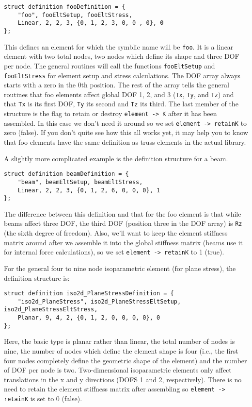 \begin{screen}
 \begin{verbatim}
struct definition fooDefinition = {   
    "foo", fooEltSetup, fooEltStress, 
    Linear, 2, 2, 3, {0, 1, 2, 3, 0, 0 , 0}, 0
};
 \end{verbatim}
\end{screen}

This defines an element for which the symblic name will be {\tt foo}.  It is
a linear element with two total nodes, two nodes which define its shape
and three DOF per node.  The general \felt{} routines will call the functions
{\tt fooEltSetup} and {\tt fooEltStress} for element setup and stress 
calculations.  The DOF array always starts with a zero in the
0th position.  The rest of the array tells the general \felt{} routines that
foo elements affect global DOF 1, 2, and 3 ({\tt Tx}, {\tt Ty}, and 
{\tt Tz}) and that {\tt Tx} is its
first DOF, {\tt Ty} its second and {\tt Tz} its third.  The last member of the
structure is the flag to retain or destroy \mbox{{\tt element -> K}} after
it has been assembled.  In this case we don't need it around so we set
\mbox{{\tt element -> retainK}} to zero (false).  If you don't quite see 
how this all works yet, it may help you to know that foo elements have the 
same definition as truss elements in the actual \felt{} library.

A slightly more complicated example is the definition structure for a beam.
\begin{screen}
 \begin{verbatim}
struct definition beamDefinition = {
    "beam", beamEltSetup, beamEltStress, 
    Linear, 2, 2, 3, {0, 1, 2, 6, 0, 0, 0}, 1
};
 \end{verbatim}
\end{screen}
The difference between this definition and that for the foo element is that
while beams affect three DOF, the third DOF (position three in the DOF array) is {\tt Rz}  (the sixth degree of freedom).
Also, we'll want to keep the element stiffness matrix around after we assemble it into the global stiffness
matrix (beams use it for internal force calculations), so we set 
\mbox{{\tt element -> retainK}} to 1 (true).

For the general four to nine node isoparametric element (for plane stress),
the definition structure is:
\begin{screen}
 \begin{verbatim}
struct definition iso2d_PlaneStressDefinition = {
    "iso2d_PlaneStress", iso2d_PlaneStressEltSetup, iso2d_PlaneStressEltStress,
    Planar, 9, 4, 2, {0, 1, 2, 0, 0, 0, 0}, 0
};
 \end{verbatim}
\end{screen}
Here, the basic type is planar rather than linear, the total number of nodes
is nine, the number of nodes which define the element shape is four (i.e.,
the first four nodes completely define the geometric shape of the element)
and the number of DOF per node is two.  Two-dimensional isoparametric
elements only affect translations in the x and y directions (DOFS 1 and 2,
respectively).  There is no need to retain the element stiffness
matrix after assembling so \mbox{{\tt element -> retainK}} is set to 0 (false). 

